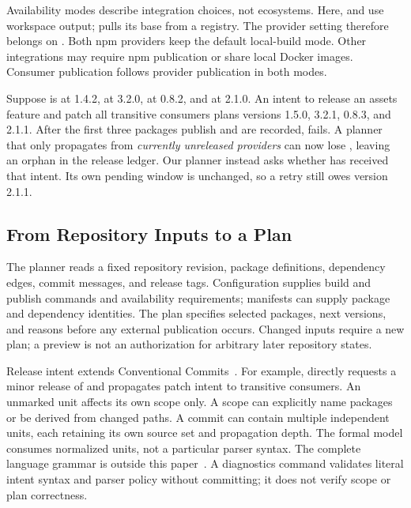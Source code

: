 Availability modes describe integration choices, not ecosystems. Here,
 and  use workspace output;  pulls its base
from a registry. The provider setting 
therefore belongs on . Both npm providers keep the default
local-build mode. Other integrations may require npm publication or share
local Docker images. Consumer publication follows provider publication in
both modes.

Suppose  is at 1.4.2,  at 3.2.0,  at
0.8.2, and  at 2.1.0. An intent to release an assets feature and patch all
transitive consumers plans versions 1.5.0, 3.2.1, 0.8.3, and 2.1.1. After the first
three packages publish and are recorded,  fails. A planner that only
propagates from \emph{currently unreleased providers} can now lose
, leaving an orphan in the release ledger. Our planner instead
asks whether  has received that intent. Its own pending window is
unchanged, so a retry still owes version 2.1.1.

\subsection{From Repository Inputs to a Plan}
\label{sec:ccme}
The planner reads a fixed repository revision, package definitions, dependency
edges, commit messages, and release tags. Configuration supplies build and
publish commands and availability requirements; manifests can supply package
and dependency identities. The plan specifies selected packages, next
versions, and reasons before any external publication occurs. Changed
inputs require a new plan; a preview is not an authorization for arbitrary
later repository states.

Release intent extends Conventional Commits~\cite{cc}. For example,
 directly requests a minor
release of  and propagates patch intent to transitive consumers.
An unmarked unit affects its own scope only. A scope can explicitly name
packages or be derived from changed paths. A commit can contain multiple
independent units, each retaining its own source set and propagation depth.
The formal model consumes normalized units, not a particular parser syntax.
The complete language grammar is outside this paper~\cite{ccme2}.
A diagnostics command validates literal intent syntax and parser policy
without committing; it does not verify scope or plan correctness.

